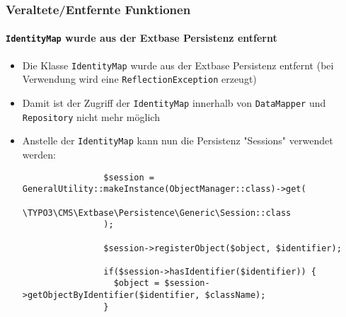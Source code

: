 \begin{frame}[fragile]
	\frametitle{Veraltete/Entfernte Funktionen}
	\framesubtitle{\texttt{IdentityMap} wurde aus der Extbase Persistenz entfernt}

	\lstset{basicstyle=\tiny\ttfamily}

	\begin{itemize}

		\item Die Klasse \texttt{IdentityMap} wurde aus der Extbase Persistenz entfernt
			\small(bei Verwendung wird eine \texttt{ReflectionException} erzeugt)\normalsize

		\item Damit ist der Zugriff der \texttt{IdentityMap} innerhalb von
			\texttt{DataMapper} und \texttt{Repository} nicht mehr möglich

		\item Anstelle der \texttt{IdentityMap} kann nun die Persistenz "Sessions" verwendet werden:

			\begin{lstlisting}
				$session = GeneralUtility::makeInstance(ObjectManager::class)->get(
				  \TYPO3\CMS\Extbase\Persistence\Generic\Session::class
				);

				$session->registerObject($object, $identifier);

				if($session->hasIdentifier($identifier)) {
				  $object = $session->getObjectByIdentifier($identifier, $className);
				}
			\end{lstlisting}

	\end{itemize}

\end{frame}


